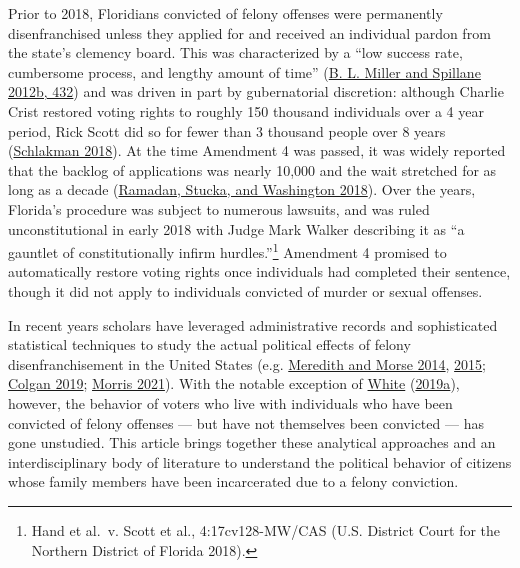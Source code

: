 \documentclass[
  12pt,
]{article}
\begin{document}
Prior to 2018, Floridians convicted of felony offenses were permanently disenfranchised unless they applied for and received an individual pardon from the state's clemency board. This was characterized by a ``low success rate, cumbersome process, and lengthy amount of time'' (\protect\hyperlink{ref-Miller2012a}{B. L. Miller and Spillane 2012b, 432}) and was driven in part by gubernatorial discretion: although Charlie Crist restored voting rights to roughly 150 thousand individuals over a 4 year period, Rick Scott did so for fewer than 3 thousand people over 8 years (\protect\hyperlink{ref-Schlakman2018}{Schlakman 2018}). At the time Amendment 4 was passed, it was widely reported that the backlog of applications was nearly 10,000 and the wait stretched for as long as a decade (\protect\hyperlink{ref-Ramadan2018}{Ramadan, Stucka, and Washington 2018}). Over the years, Florida's procedure was subject to numerous lawsuits, and was ruled unconstitutional in early 2018 with Judge Mark Walker describing it as ``a gauntlet of constitutionally infirm hurdles.''\footnote{Hand et al.~v. Scott et al., 4:17cv128-MW/CAS (U.S. District Court for the Northern District of Florida 2018).} Amendment 4 promised to automatically restore voting rights once individuals had completed their sentence, though it did not apply to individuals convicted of murder or sexual offenses.

In recent years scholars have leveraged administrative records and sophisticated statistical techniques to study the actual political effects of felony disenfranchisement in the United States (e.g. \protect\hyperlink{ref-Meredith2014}{Meredith and Morse 2014}, \protect\hyperlink{ref-Meredith2015}{2015}; \protect\hyperlink{ref-Colgan2019}{Colgan 2019}; \protect\hyperlink{ref-Morris2021}{Morris 2021}). With the notable exception of \protect\hyperlink{ref-White2019a}{White} (\protect\hyperlink{ref-White2019a}{2019a}), however, the behavior of voters who live with individuals who have been convicted of felony offenses --- but have not themselves been convicted --- has gone unstudied. This article brings together these analytical approaches and an interdisciplinary body of literature to understand the political behavior of citizens whose family members have been incarcerated due to a felony conviction.
\end{document}
